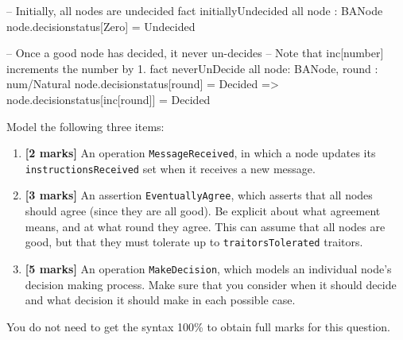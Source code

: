 \begin{alloy}
-- Initially, all nodes are undecided 
fact initiallyUndecided {
   all node : BANode {
      node.decisionstatus[Zero] = Undecided
   }
}

-- Once a good node has decided, it never un-decides
-- Note that inc[number] increments the number by 1.
fact neverUnDecide {
   all node: BANode, round : num/Natural {
      node.decisionstatus[round] = Decided => 
         node.decisionstatus[inc[round]] = Decided
   }
}
\end{alloy}

Model the following three items:

\begin{enumerate}

 \item \textbf{[2 marks]} An operation \texttt{MessageReceived}, in which a node updates its \texttt{instructionsReceived} set when it receives a new message.

 \item \textbf{[3 marks]} An assertion \texttt{EventuallyAgree}, which asserts that all nodes should agree (since they are all good).  Be explicit about what agreement means, and at what round
 they agree.  This can  assume that all nodes are good, but that they must tolerate up to \texttt{traitorsTolerated} traitors. 

 \item \textbf{[5 marks]} An operation \texttt{MakeDecision}, which models an individual node's decision making process.  Make sure that you consider when it should decide and what decision it should make in each possible case.

\end{enumerate}




You do not need to get the syntax 100\% to obtain full marks for this question.